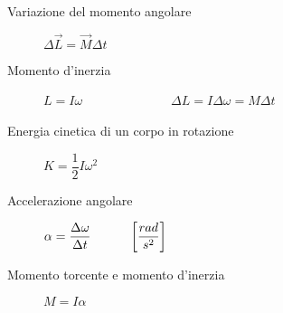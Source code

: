 \documentclass[a4paper,11pt,italian]{article}
\begin{document}
\begin{description}
%   
  \item[Variazione del momento angolare] 
  $ \Delta \vec{L} = \vec{M}\Delta t $
  
  \item[Momento d'inerzia] 
%   
  
  $ L = I\omega $~~~~~~~~~~~~~~$ \Delta L = I\Delta\omega = M \Delta t $
  
  \item[Energia cinetica di un corpo in rotazione]
  $ K = \dfrac{1}{2}I\omega^2 $
  
  \item[Accelerazione angolare]
  $ \alpha = \dfrac{\Delta \omega}{\Delta t} \hspace*{3em} \left[ \dfrac{rad}{s^2} \right] $
  
  \item[Momento torcente e momento d'inerzia]
  $ M = I \alpha $
  

\end{description}
\end{document}
